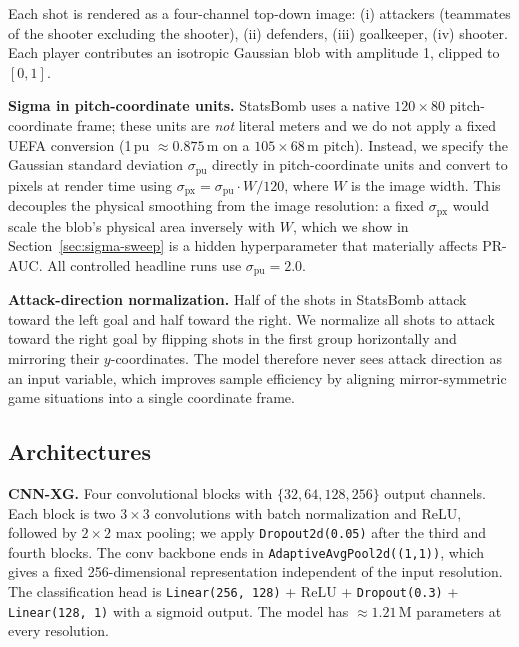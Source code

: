 \documentclass[runningheads,a4paper]{llncs}
\begin{document}
Each shot is rendered as a four-channel top-down image: (i) attackers
(teammates of the shooter excluding the shooter), (ii) defenders,
(iii) goalkeeper, (iv) shooter. Each player contributes an isotropic
Gaussian blob with amplitude 1, clipped to $[0,1]$.

\textbf{Sigma in pitch-coordinate units.}
StatsBomb uses a native $120{\times}80$ pitch-coordinate frame; these
units are \emph{not} literal meters and we do not apply a fixed UEFA
conversion (1\,pu $\approx 0.875$\,m on a $105{\times}68$\,m pitch).
Instead, we specify the Gaussian standard deviation $\sigma_{\text{pu}}$
directly in pitch-coordinate units and convert to pixels at render
time using
$\sigma_{\text{px}} = \sigma_{\text{pu}} \cdot W / 120$,
where $W$ is the image width. This decouples the physical smoothing
from the image resolution: a fixed $\sigma_{\text{px}}$ would scale
the blob's physical area inversely with $W$, which we show in
Section~\ref{sec:sigma-sweep} is a hidden hyperparameter that
materially affects PR-AUC. All controlled headline runs use
$\sigma_{\text{pu}}=2.0$.

\textbf{Attack-direction normalization.}
Half of the shots in StatsBomb attack toward the left goal and half
toward the right. We normalize all shots to attack toward the right
goal by flipping shots in the first group horizontally and mirroring
their $y$-coordinates. The model therefore never sees attack direction
as an input variable, which improves sample efficiency by aligning
mirror-symmetric game situations into a single coordinate frame.

\subsection{Architectures}
\label{sec:arch}

\textbf{CNN-XG.}
Four convolutional blocks with $\{32, 64, 128, 256\}$ output channels.
Each block is two $3{\times}3$ convolutions with batch normalization
and ReLU, followed by $2{\times}2$ max pooling; we apply
\texttt{Dropout2d(0.05)} after the third and fourth blocks.
The conv backbone ends in
\texttt{AdaptiveAvgPool2d((1,1))}, which gives a fixed 256-dimensional
representation independent of the input resolution. The classification
head is \texttt{Linear(256, 128)} + ReLU + \texttt{Dropout(0.3)} +
\texttt{Linear(128, 1)} with a sigmoid output. The model has
$\approx 1.21$\,M parameters at every resolution.
\end{document}
